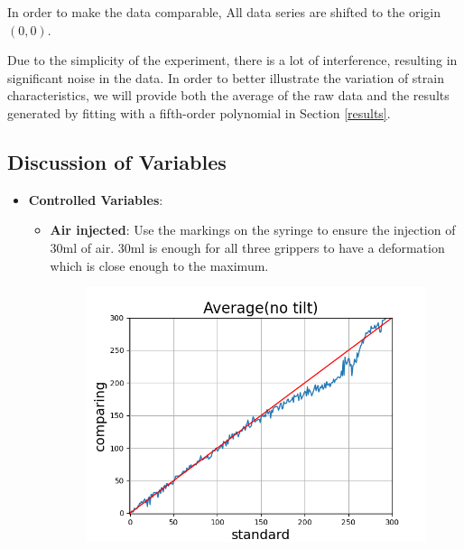 \documentclass[conference]{IEEEtran}
\begin{document}
In order to make the data comparable, All data series are shifted to the origin $(0,0)$.

Due to the simplicity of the experiment, there is a lot of interference, resulting in significant noise in the data. In order to better illustrate the variation of strain characteristics, we will provide both the average of the raw data and the results generated by fitting with a fifth-order polynomial in Section \ref{results}.


\subsection{Discussion of Variables}

\begin{itemize}
    \item \textbf{Controlled Variables}: %
    \begin{itemize}
        \item \textbf{Air injected}: Use the markings on the syringe to ensure the injection of 30ml of air. 30ml is enough for all three grippers to have a deformation which is close enough to the maximum.

\begin{figure}[htbp]
  \centering
  \begin{minipage}[t]{0.32\textwidth}
    \centering
    \includegraphics[width=\textwidth]{pics/Section3/Average0.png}


\end{minipage}
\end{figure}
\end{itemize}
\end{itemize}
\end{document}
